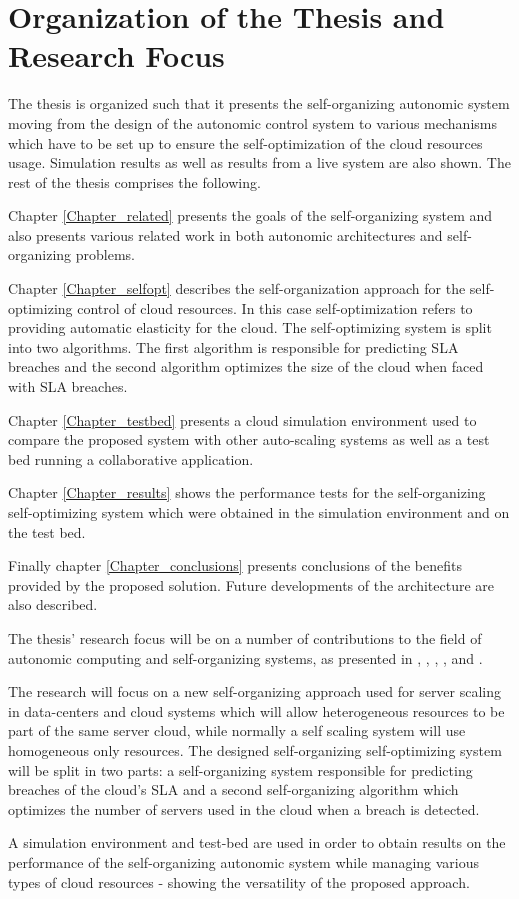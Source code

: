 \section{Organization of the Thesis and Research Focus}

The thesis is organized such that it presents the self-organizing autonomic system moving from the design of the autonomic control system to various mechanisms which have to be set up to ensure the self-optimization of the cloud resources usage. Simulation results as well as results from a live system are also shown. The rest of the thesis comprises the following.

Chapter \ref{Chapter_related} presents the goals of the self-organizing system and also presents various related work in both autonomic architectures and self-organizing problems.

Chapter \ref{Chapter_selfopt} describes the self-organization approach for the self-optimizing control of cloud resources. In this case self-optimization refers to providing automatic elasticity for the cloud. The self-optimizing system is split into two algorithms. The first algorithm is responsible for predicting SLA breaches and the second algorithm optimizes the size of the cloud when faced with SLA breaches.

Chapter \ref{Chapter_testbed} presents a cloud simulation environment used to compare the proposed system with other auto-scaling systems as well as a test bed running a collaborative application.

Chapter \ref{Chapter_results} shows the performance tests for the self-organizing self-optimizing system which were obtained in the simulation environment and on the test bed.

Finally chapter \ref{Chapter_conclusions} presents conclusions of the benefits provided by the proposed solution. Future developments of the architecture are also described.

The thesis' research focus will be on a number of contributions to the field of autonomic computing and self-organizing systems, as presented in \cite{bogdan:lindi}, \cite{bogdan:amgcc2013}, \cite{bogdan:cts2012}, \cite{bogdan:conti2010}, \cite{bogdan:saci2013} and \cite{bogdan:miles2012chapter}. 

The research will focus on a new self-organizing approach used for server scaling in data-centers and cloud systems which will allow heterogeneous resources to be part of the same server cloud, while normally a self scaling system will use homogeneous only resources. The designed self-organizing self-optimizing system will be split in two parts: a self-organizing system responsible for predicting breaches of the cloud's SLA and a second self-organizing algorithm which optimizes the number of servers used in the cloud when a breach is detected.

A simulation environment and test-bed are used in order to obtain results on the performance of the self-organizing autonomic system while managing various types of cloud resources - showing the versatility of the proposed approach.